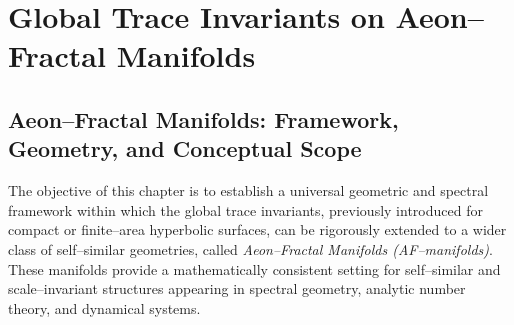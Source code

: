 
\section{Global Trace Invariants on Aeon–Fractal Manifolds}
\label{sec:global-trace-invariants}
\relax \hspace{0pt}


\subsection{Aeon–Fractal Manifolds: Framework, Geometry, and Conceptual Scope}
\relax \hspace{0pt}

The objective of this chapter is to establish a universal geometric and spectral framework
within which the global trace invariants, previously introduced for compact or finite–area hyperbolic
surfaces, can be rigorously extended to a wider class of self–similar geometries,
called \emph{Aeon–Fractal Manifolds (AF–manifolds)}.
These manifolds provide a mathematically consistent setting for self–similar
and scale–invariant structures appearing in spectral geometry,
analytic number theory, and dynamical systems.


